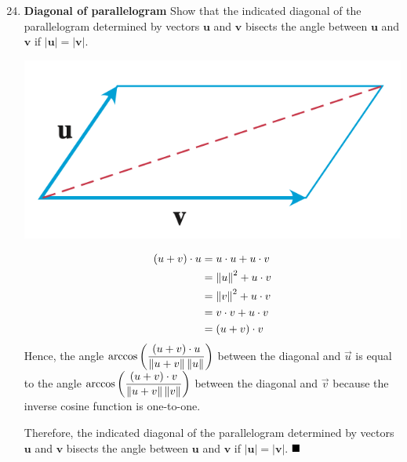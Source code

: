 \begin{enumerate}
          \setcounter{enumi}{23}
    \item \textbf{Diagonal of parallelogram} Show that the indicated diagonal of the parallelogram
          determined by vectors $\mathbf{u}$ and $\mathbf{v}$ bisects the angle between
          $\mathbf{u}$ and $\mathbf{v}$ if $|\mathbf{u}|=|\mathbf{v}|$.
          \begin{center}
              \includegraphics[scale=0.5]{assets/thomas12.3q24.png}
          \end{center}
          \begin{align*}
              (u + v) \cdot u & = u \cdot u + u \cdot v  \\
                              & = \left\lVert u\right\rVert^2 + u \cdot v \\
                              & = \left\lVert v\right\rVert^2 + u \cdot v \\
                              & = v \cdot v + u \cdot v  \\
                              & = (u + v) \cdot v
          \end{align*}
          Hence, the angle $\arccos\left(\dfrac{(u + v) \cdot u}{\left\lVert u + v\right\rVert \left\lVert u\right\rVert}\right)$ between the diagonal and $\vec{u}$ is equal to the angle $\arccos\left(\dfrac{(u + v) \cdot v}{\left\lVert u + v\right\rVert \left\lVert v\right\rVert}\right)$ between the diagonal and $\vec{v}$ because the inverse cosine function is one-to-one.

          Therefore, the indicated diagonal of the parallelogram determined by vectors
          $\mathbf{u}$ and $\mathbf{v}$ bisects the angle between $\mathbf{u}$ and
          $\mathbf{v}$ if $|\mathbf{u}|=|\mathbf{v}|$. $\hfill\blacksquare$


\end{enumerate}
